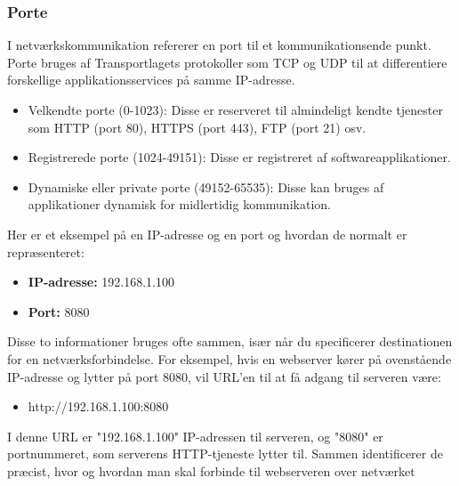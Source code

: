 \subsubsection{Porte}
I netværkskommunikation refererer en port til et kommunikationsende punkt. Porte bruges af Transportlagets protokoller som TCP og UDP til at differentiere forskellige applikationsservices på samme IP-adresse.
\begin{itemize}
	\item Velkendte porte (0-1023): Disse er reserveret til almindeligt kendte tjenester som HTTP (port 80), HTTPS (port 443), FTP (port 21) osv.
	\item Registrerede porte (1024-49151): Disse er registreret af softwareapplikationer.
	\item Dynamiske eller private porte (49152-65535): Disse kan bruges af applikationer dynamisk for midlertidig kommunikation.
\end{itemize}
Her er et eksempel på en IP-adresse og en port og hvordan de normalt er repræsenteret:
\begin{itemize}
	\item \textbf{IP-adresse:} 192.168.1.100
	\item \textbf{Port:} 8080 
\end{itemize}
Disse to informationer bruges ofte sammen, især når du specificerer destinationen for en netværksforbindelse. For eksempel, hvis en webserver kører på ovenstående IP-adresse og lytter på port 8080, vil URL'en til at få adgang til serveren være:
\begin{itemize}
	\item http://192.168.1.100:8080
\end{itemize}
I denne URL er "192.168.1.100" IP-adressen til serveren, og "8080" er portnummeret, som serverens HTTP-tjeneste lytter til. Sammen identificerer de præcist, hvor og hvordan man skal forbinde til webserveren over netværket
